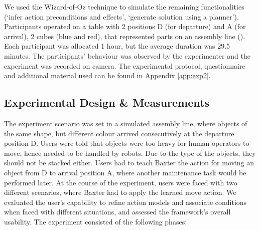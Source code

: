 We used the Wizard-of-Oz technique to simulate the remaining functionalities (\eg `infer action preconditions and effects', `generate solution using a planner').
Participants operated on a table with 2 positions D (for departure) and A (for arrival), 2 cubes (blue and red), that represented parts on an assembly line (). 
Each participant was allocated 1 hour, but the average duration was 29.5 minutes. 
The participants' behaviour was observed by the experimenter and the experiment was recorded on camera.
The experimental protocol, questionnaire and additional material used can be found in Appendix \ref{app:exp2}.

\subsection{Experimental Design \& Measurements}
The experiment scenario was set in a simulated assembly line, where objects of the same shape, but different colour arrived consecutively at the departure position D.
Users were told that objects were too heavy for human operators to move, hence needed to be handled by robots.
Due to the type of the objects, they should not be stacked either.
Users had to teach Baxter the action for moving an object from D to arrival position A, where another maintenance task would be performed later.
At the course of the experiment, users were faced with two different scenarios, where Baxter had to apply the learned move action. 
We evaluated the user's capability to refine action models and associate conditions when faced with different situations, and assessed the framework's overall usability.
The experiment consisted of the following phases:
